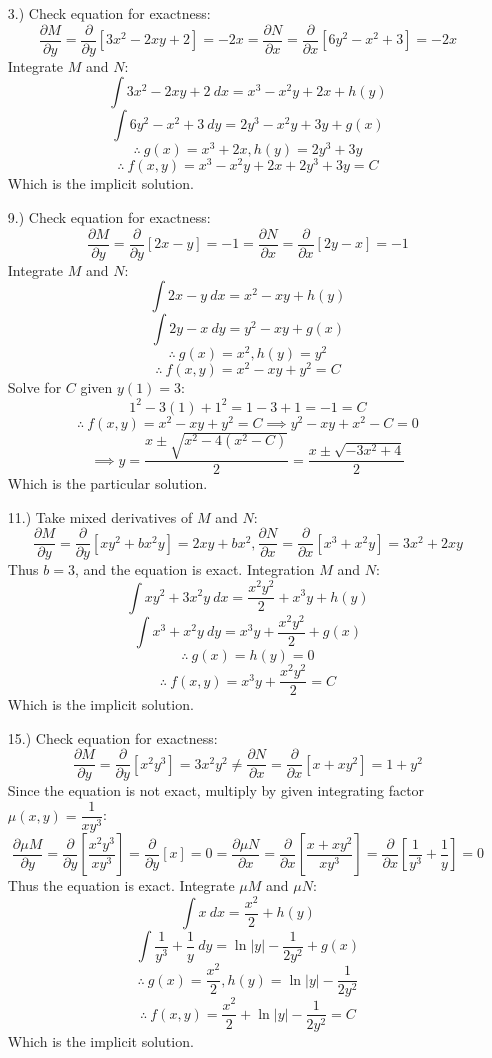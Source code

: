 \documentclass[12pt]{article}
\newcommand{\bracks}[1]{\left[#1\right]}
\newcommand{\pderv}[2]{\dfrac{\partial#1}{\partial#2}}
\begin{document}
\pagestyle{fancy}
\fancyhead{}

\normalsize
\begin{itemize}
    \item [3.)] Check equation for exactness:
    \[\pderv{M}{y}=\pderv{}{y}\bracks{3x^2-2xy+2}=-2x=\pderv{N}{x}=\pderv{}{x}\bracks{6y^2-x^2+3}=-2x\]
    Integrate $M$ and $N$:
    \[\int 3x^2-2xy+2\ dx=x^3-x^2y+2x+h(y)\]
    \[\int 6y^2-x^2+3\ dy=2y^3-x^2y+3y+g(x)\]
    \[\therefore\ g(x)=x^3+2x,h(y)=2y^3+3y\]
    \[\therefore\ f(x,y)=x^3-x^2y+2x+2y^3+3y=C\]
    Which is the implicit solution.

    \item [9.)] Check equation for exactness:
    \[\pderv{M}{y}=\pderv{}{y}\bracks{2x-y}=-1=\pderv{N}{x}=\pderv{}{x}\bracks{2y-x}=-1\]
    Integrate $M$ and $N$:
    \[\int 2x-y\ dx=x^2-xy+h(y)\]
    \[\int 2y-x\ dy=y^2-xy+g(x)\]
    \[\therefore\ g(x)=x^2,h(y)=y^2\]
    \[\therefore\ f(x,y)=x^2-xy+y^2=C\]
    Solve for $C$ given $y(1)=3$:
    \[1^2-3(1)+1^2=1-3+1=-1=C\]
    \[\therefore\ f(x,y)=x^2-xy+y^2=C\implies y^2-xy+x^2-C=0\]
    \[\implies y=\frac{x\pm\sqrt{x^2-4(x^2-C)}}{2}=\frac{x\pm\sqrt{-3x^2+4}}{2}\]
    Which is the particular solution.

    \pagebreak
    \item [11.)] Take mixed derivatives of $M$ and $N$:
    \[\pderv{M}{y}=\pderv{}{y}\bracks{xy^2+bx^2y}=2xy+bx^2,\pderv{N}{x}=\pderv{}{x}\bracks{x^3+x^2y}=3x^2+2xy\]
    Thus $b=3$, and the equation is exact. Integration $M$ and $N$:
    \[\int xy^2+3x^2y\ dx=\frac{x^2y^2}{2}+x^3y+h(y)\]
    \[\int x^3+x^2y\ dy=x^3y+\frac{x^2y^2}{2}+g(x)\]
    \[\therefore\ g(x)=h(y)=0\]
    \[\therefore\ f(x,y)=x^3y+\frac{x^2y^2}{2}=C\]
    Which is the implicit solution.

    \item [15.)] Check equation for exactness:
    \[\pderv{M}{y}=\pderv{}{y}\bracks{x^2y^3}=3x^2y^2\neq\pderv{N}{x}=\pderv{}{x}\bracks{x+xy^2}=1+y^2\]
    Since the equation is not exact, multiply by given integrating factor $\mu(x,y)=\dfrac{1}{xy^3}$:
    \[\pderv{\mu M}{y}=\pderv{}{y}\bracks{\frac{x^2y^3}{xy^3}}=\pderv{}{y}\bracks{x}=0=\pderv{\mu N}{x}=\pderv{}{x}\bracks{\frac{x+xy^2}{xy^3}}=\pderv{}{x}\bracks{\frac{1}{y^3}+\frac{1}{y}}=0\]
    Thus the equation is exact. Integrate $\mu M$ and $\mu N$:
    \[\int x\ dx=\frac{x^2}{2}+h(y)\]
    \[\int\frac{1}{y^3}+\frac{1}{y}\ dy=\ln\vert y\vert-\frac{1}{2y^2}+g(x)\]
    \[\therefore\ g(x)=\frac{x^2}{2},h(y)=\ln\vert y\vert-\frac{1}{2y^2}\]
    \[\therefore\ f(x,y)=\frac{x^2}{2}+\ln\vert y\vert-\frac{1}{2y^2}=C\]
    Which is the implicit solution.


\end{itemize}
\end{document}
